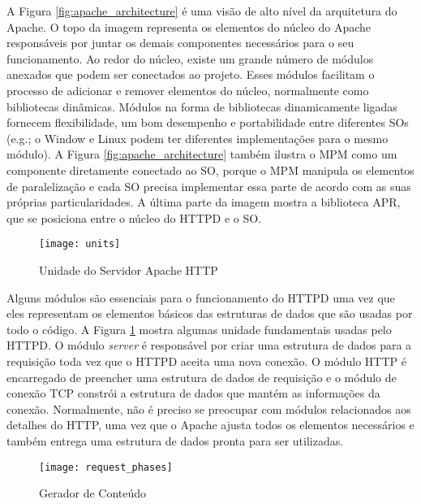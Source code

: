 A Figura \ref{fig:apache_architecture} é uma visão de alto nível da arquitetura
do Apache. O topo da imagem representa os elementos do núcleo do Apache
responsáveis por juntar os demais componentes necessários para o seu
funcionamento. Ao redor do núcleo, existe um grande número de módulos anexados
que podem ser conectados ao projeto. Esses módulos facilitam o processo de
adicionar e remover elementos do núcleo, normalmente como bibliotecas
dinâmicas. Módulos na forma de bibliotecas dinamicamente ligadas fornecem
flexibilidade, um bom desempenho e portabilidade entre diferentes SOs (e.g.; o
Window e Linux podem ter diferentes implementações para o mesmo módulo). A
Figura \ref{fig:apache_architecture} também ilustra o MPM como um componente
diretamente conectado ao SO, porque o MPM manipula os elementos de
paralelização e cada SO precisa implementar essa parte de acordo com as suas
próprias particularidades. A última parte da imagem mostra a biblioteca APR,
que se posiciona entre o núcleo do HTTPD e o SO.

\begin{figure}[!h]
  \centering
  \texttt{[image: units]} 
  \caption{Unidade do Servidor Apache HTTP}
  \label{fig:units} 
\end{figure}

Alguns módulos são essenciais para o funcionamento do HTTPD uma vez que eles
representam os elementos básicos das estruturas de dados que são usadas por
todo o código. A Figura \ref{fig:units} mostra algumas unidade fundamentais
usadas pelo HTTPD. O módulo \textit{server} é responsável por criar uma estrutura de
dados para a requisição toda vez que o HTTPD aceita uma nova conexão. O módulo
HTTP é encarregado de preencher uma estrutura de dados de requisição e o
módulo de conexão TCP constrói a estrutura de dados que mantém as informações
da conexão. Normalmente, não é preciso se preocupar com módulos relacionados
aos detalhes do HTTP, uma vez que o Apache ajusta todos os elementos necessários
e também entrega uma estrutura de dados pronta para ser utilizadas.

\begin{figure}[!h]
  \centering
  \texttt{[image: request\_phases]} 
  \caption{Gerador de Conteúdo \citep{apache_module_book}}
  \label{fig:content_generator} 
\end{figure}

